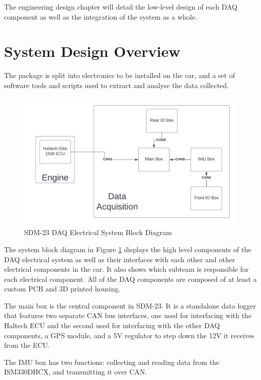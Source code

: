 The engineering design chapter will detail the low-level design of each DAQ component as well as the integration of the system as a whole.

\section{System Design Overview}
The package is split into electronics to be installed on the car, and a set of software tools and scripts used to extract and analyse the data collected.

\begin{figure}[H]
    \centering
    \includegraphics[width=6in]{images/SDM-23 System.png}
    \caption{SDM-23 DAQ Electrical System Block Diagram}
    \label{fig:sdm23-systemdiagram}
\end{figure}
The system block diagram in Figure \ref{fig:sdm23-systemdiagram} displays the high level components of the DAQ electrical system as well as their interfaces with each other and other electrical components in the car.
It also shows which subteam is responsible for each electrical component.
All of the DAQ components are composed of at least a custom PCB and 3D printed housing.
\vspace{1em}

The main box is the central component in SDM-23.
It is a standalone data logger that features two separate CAN bus interfaces, one used for interfacing with the Haltech ECU and the second used for interfacing with the other DAQ components, a GPS module, and a 5V regulator to step down the 12V it receives from the ECU.
\vspace{1em}

The IMU box has two functions: collecting and reading data from the ISM330DHCX, and transmitting it over CAN.
\vspace{1em}

